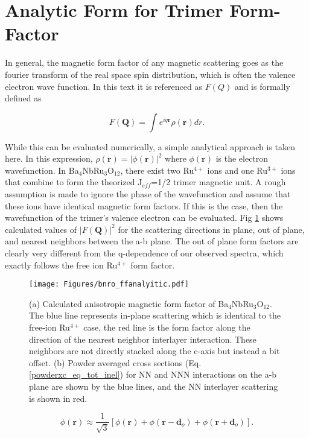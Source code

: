 \documentclass[%
 reprint,
superscriptaddress,
 amsmath,amssymb,
 aps,
 prb,
]{revtex4-2}
\begin{document}
\section{Analytic Form for Trimer Form-Factor}

In general, the magnetic form factor of any magnetic scattering goes as the fourier transform of the real space spin distribution, which is often the valence electron wave function. In this text it is referenced as $F(Q)$ and is formally defined as 

\begin{equation}
    F(\textbf{Q})=\int e^{iq\textbf{r}}\rho(\textbf{r})dr.
    \label{ft_eq}
\end{equation}

While this can be evaluated numerically, a simple analytical approach is taken here. In this expression, $\rho(\textbf{r})=|\phi(\textbf{r})|^2$ where $\phi(\textbf{r})$ is the electron wavefunction. In Ba$_4$NbRu$_3$O$_{12}$, there exist two Ru$^{4+}$ ions and one Ru$^{3+}$ ions that combine to form the theorized J$_{eff}$=1/2 trimer magnetic unit. A rough assumption is made to ignore the phase of the wavefunction and assume that these ions have identical magnetic form factors. If this is the case, then the wavefunction of the trimer's valence electron can be evaluated. 
Fig \ref{fig:ff_calc_fig} shows calculated values of $|F(\textbf{Q})|^2$ for the scattering directions in plane, out of plane, and nearest neighbors between the a-b plane. The out of plane form factors are clearly very different from the q-dependence of our observed spectra, which exactly follows the free ion Ru$^{4+}$ form factor.
\begin{figure}
    \centering
    \texttt{[image: Figures/bnro\_ffanalyitic.pdf]}
    \vspace{-1cm}
    \caption{(a) Calculated anisotropic magnetic form factor of Ba$_4$NbRu$_3$O$_{12}$. The blue line represents in-plane scattering which is identical to the free-ion Ru$^{4+}$ case, the red line is the form factor along the direction of the nearest neighbor interlayer interaction. These neighbors are not directly stacked along the c-axis but instead a bit offset. (b) Powder averaged cross sections (Eq. \ref{powderxc_eq_tot_inel}) for NN and NNN interactions on the a-b plane are shown by the blue lines, and the NN interlayer scattering is shown in red.}
    \label{fig:ff_calc_fig}
\end{figure}

\begin{equation}
    \phi(\textbf{r}) \approx \frac{1}{\sqrt{3}}[ \phi(\textbf{r})+\phi(\textbf{r}-\textbf{d}_o)+\phi(\textbf{r}+\textbf{d}_o)].
    \label{wavefunc_eq}
\end{equation}
\end{document}
